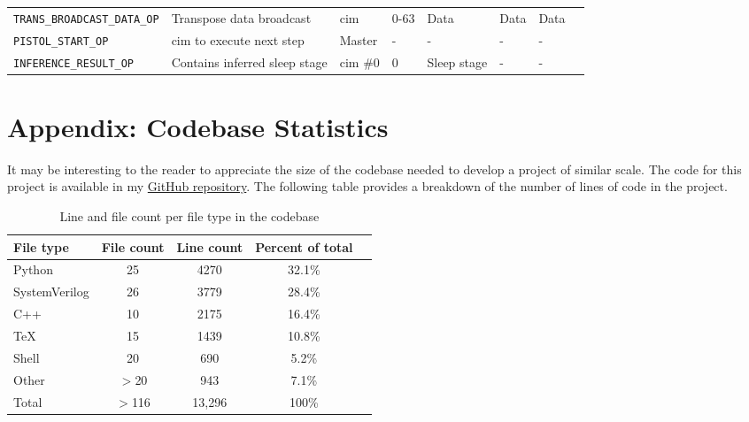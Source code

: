 \begin{sidewaystable}
\begin{tabular}{@{} p{6.5cm}lllllll @{}}
        \texttt{TRANS\_BROADCAST\_DATA\_OP}         & Transpose data broadcast          & \ac{cim}      & 0-63          & Data              & Data              & Data \\
        \texttt{PISTOL\_START\_OP}                  & \ac{cim} to execute next step     & Master        & -             & -                 & -                 & - \\
        \texttt{INFERENCE\_RESULT\_OP}              & Contains inferred sleep stage     & \ac{cim} \#0  & 0             & Sleep stage       & -                 & - \\
    \end{tabular}
    \normalsize
    \label{tab:bus_ops}
\end{sidewaystable}

\section{Appendix: Codebase Statistics}
It may be interesting to the reader to appreciate the size of the codebase needed to develop a project of similar scale. The code for this project is available 
in my \href{https://github.com/TristanRobitaille/engsci-thesis}{GitHub repository}. The following table provides a breakdown of the number of lines of code in the project.

\begin{table}
    \centering
    \renewcommand{\arraystretch}{1.2} %
    \setlength{\arrayrulewidth}{1.5pt} %
    \caption{Line and file count per file type in the codebase}
    \begin{tabular}{@{} p{4cm}cccr @{}}
        \toprule
        File type       & File count    & Line count    & Percent of total & \\\midrule
        Python          & 25            & 4270          & 32.1\% \\
        SystemVerilog   & 26            & 3779          & 28.4\% \\
        C++             & 10            & 2175          & 16.4\% \\
        TeX             & 15            & 1439          & 10.8\%  \\
        Shell           & 20            & 690           & 5.2\%  \\
        Other           & $>$20         & 943           & 7.1\%  \\\midrule
        Total           & $>$116        & 13,296        & 100\%  \\
        \hline
    \end{tabular}
    \label{tab:line_cnt}
\end{table}

